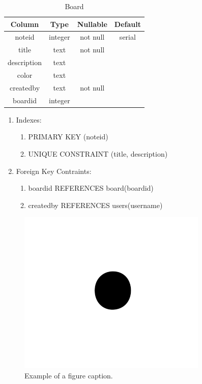 \documentclass[conference]{IEEEtran}
\begin{document}
\begin{table}[htbp]
  \caption{Board}
  \begin{center}
    \begin{tabular}{|c|c|c|c|}
      \hline
      \textbf{Column} & \textbf{Type} & \textbf{Nullable} & \textbf{Default}\\
      \hline
      noteid & integer & not null & serial\\
      title & text & not null &\\
      description & text &&\\
      color & text &&\\
      createdby & text & not null &\\
      boardid & integer &&\\
      \hline
    \end{tabular}
    \begin{enumerate}
    \item Indexes:
      \begin{enumerate}
      \item PRIMARY KEY (noteid)
      \item UNIQUE CONSTRAINT (title, description)
      \end{enumerate}
    \item Foreign Key Contraints:
      \begin{enumerate}
      \item boardid REFERENCES board(boardid)
      \item createdby REFERENCES users(username)
      \end{enumerate}
    \end{enumerate}
    \label{note}
  \end{center}
\end{table}

\begin{figure}[htbp]
  \centerline{\includegraphics{fig1.png}}
  \caption{Example of a figure caption.}
  \label{fig}
\end{figure}
\end{document}
